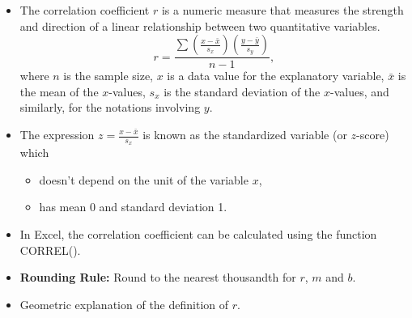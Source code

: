 \begin{itemize}
\item
  The correlation coefficient \(r\) is a numeric measure that measures
  the strength and direction of a linear relationship between two
  quantitative variables. \[
  r=\dfrac{\sum\left(\frac{x-\bar{x}}{s_x}\right)\left(\frac{y-\bar{y}}{s_y}\right)}{n-1},
  \] where \(n\) is the sample size, \(x\) is a data value for the
  explanatory variable, \(\bar{x}\) is the mean of the \(x\)-values,
  \(s_x\) is the standard deviation of the \(x\)-values, and similarly,
  for the notations involving $y$.
\item
  The expression \(z=\frac{x-\bar{x}}{s_x}\) is known as the
  standardized variable (or \(z\)-score) which

  \begin{itemize}
  \item
    doesn't depend on the unit of the variable \(x\),
  \item
    has mean \(0\) and standard deviation 1.
  \end{itemize}
\item
  In Excel, the correlation coefficient can be calculated using the
  function \textsf{CORREL()}.
\item
  \textbf{Rounding Rule:} Round to the nearest thousandth for \(r\),
  \(m\) and \(b\).
\item
  Geometric explanation of the definition of \(r\).
\end{itemize}

